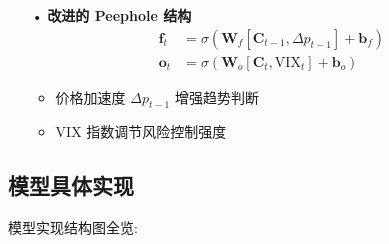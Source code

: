 \documentclass[a4paper,12pt]{ctexart}
\begin{document}
\begin{itemize}
  \item[•] \textbf{改进的 Peephole 结构}
  \begin{equation*}
  \begin{aligned}
  \mathbf{f}_t &= \sigma\left(\mathbf{W}_f[\mathbf{C}_{t-1}, \Delta p_{t-1}] + \mathbf{b}_f\right) \\
  \mathbf{o}_t &= \sigma\left(\mathbf{W}_o[\mathbf{C}_t, \text{VIX}_t] + \mathbf{b}_o\right)
  \end{aligned}
  \end{equation*}
  \begin{itemize}
    \item 价格加速度 $\Delta p_{t-1}$ 增强趋势判断
    \item VIX 指数调节风险控制强度
  \end{itemize}
\end{itemize}




\newpage
\subsection{模型具体实现} 

模型实现结构图全览:
\end{document}
